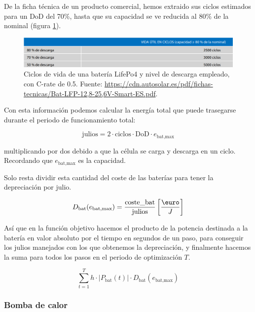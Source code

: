 De la ficha técnica de un producto comercial, hemos extraido sus ciclos
estimados para un DoD del 70\%, hasta que su capacidad se ve reducida al
80\% de la nominal (figura \ref{fig:battery_datasheet_cycles}).

\begin{figure}[h] \centering
	\centering
	\includegraphics[width=1\textwidth]{./capitulos/resultados_discusion/images/battery_datasheet_cycles.png}
	\caption{Ciclos de vida de una batería LifePo4 y nivel de descarga empleado,
		con C-rate de 0.5. Fuente:
		\url{https://cdn.autosolar.es/pdf/fichas-tecnicas/Bat-LFP-12,8-25,6V-Smart-ES.pdf}.}
	\label{fig:battery_datasheet_cycles}
\end{figure}

Con esta información podemos calcular la energía total que puede trasegarse durante
el periodo de funcionamiento total:

\begin{equation}
	\text{julios} = 2 \cdot \text{ciclos} \cdot \text{DoD} \cdot e_\text{bat,max}
\end{equation}

multiplicando por dos debido a que la célula se carga y descarga en un ciclo.
Recordando que $e_\text{bat,max}$ es la capacidad.

Solo resta dividir esta cantidad del coste de las baterías para tener la depreciación
por julio.

\begin{equation}
	D_\text{bat}(e_\text{bat,max}) = \frac{\text{coste\_bat}}{\text{julios}} \left[\frac{\text{\euro}}{J}\right]
\end{equation}

Así que en la función objetivo hacemos el producto de la potencia destinada a
la batería en valor absoluto por el tiempo en segundos de un paso, para
conseguir los julios manejados con los que obtenemos la depreciación, y
finalmente hacemos la suma para todos los pasos en el periodo de optimización $T$.

\begin{equation}
	\sum_{t=1}^{T} h \cdot |P_\text{bat}(t)| \cdot D_\text{bat}(e_\text{bat,max})
\end{equation}


\subsubsection{Bomba de calor}


